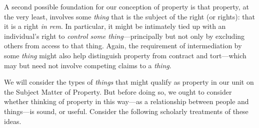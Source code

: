 A second possible foundation for our conception of property is that property, at
the very least, involves some \textit{thing} that is the subject of the right
(or rights): that it is a right \textit{in rem}. In particular, it might be
intimately tied up with an individual's right to \textit{control some
thing}---principally but not only by excluding others from access to that
thing. Again, the requirement of intermediation by some \textit{thing} might
also help distinguish property from contract and tort---which may but need not
involve competing claims to a \textit{thing}.

We will consider the types of \textit{things} that might qualify as property in
our unit on the Subject Matter of Property. But before doing so, we ought to
consider whether thinking of property in this way---as a relationship between
people and things---is sound, or useful. Consider the following scholarly
treatments of these ideas.


